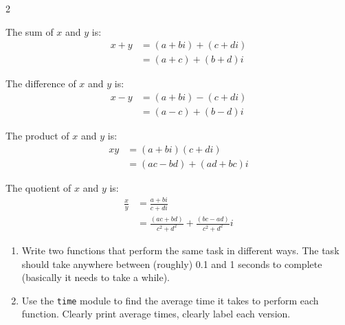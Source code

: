 \documentclass[12pt]{article}%
\newcommand{\code}[1]{\texttt{#1}}
\begin{document}
\begin{multicols*}{2}
\begin{Exercise}[origin={10 points, Python}]
The sum of $x$ and $y$ is:
\begin{align*}
x + y &= (a + bi) + (c + di) \\
      &= (a + c) + (b + d)i
\end{align*}

The difference of $x$ and $y$ is:
\begin{align*}
x - y &= (a + bi) - (c + di) \\
      &= (a - c) + (b - d)i
\end{align*}

The product of $x$ and $y$ is:
\begin{align*}
xy &= (a + bi) (c + di) \\
   &= (ac - bd) + (ad + bc)i
\end{align*}

The quotient of $x$ and $y$ is:
\begin{align*}
\frac{x}{y} &= \frac{a + bi}{c + di} \\
            &= \frac{(ac + bd)}{c^2 + d^2} + \frac{(bc - ad)}{c^2 + d^2}i
\end{align*}

\end{Exercise}




\begin{Exercise}[origin={20 points, Python}]

\begin{enumerate}[leftmargin=*]
	\item Write two functions that perform the same task in different ways. The task should take anywhere between (roughly) 0.1 and 1 seconds to complete (basically it needs to take a while).
	\item Use the \code{time} module to find the average time it takes to perform each function. Clearly print average times, clearly label each version.
\end{enumerate}

\end{Exercise}



\vfill\null
\end{multicols*}
\end{document}
